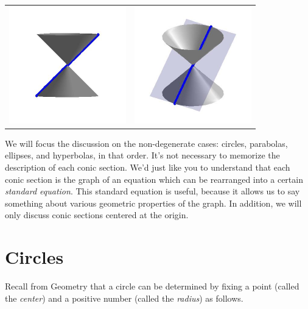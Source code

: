 \documentclass[nooutcomes]{ximera}
\begin{document}
\begin{center}
\begin{tabular}{cc}
\includegraphics[width=2in]{./ConicsGraphics/Tline01.jpg} & \includegraphics[width=2in]{./ConicsGraphics/Tline02.jpg} \\

\end{tabular}

\end{center}


We will focus the discussion on the non-degenerate cases: circles, parabolas, ellipses, and hyperbolas, in that order. It's not necessary to memorize the description of each conic section. We'd just like you to understand that each conic section is the graph of an equation which can be rearranged into a certain \emph{standard equation}. This standard equation is useful, because it allows us to say something about various geometric properties of the graph. In addition, we will only discuss conic sections centered at the origin.
\newpage

\section{Circles}
Recall from Geometry that a circle can be determined by fixing a point (called the \emph{center}) and a positive number (called the \emph{radius}) as follows.    
\end{document}
